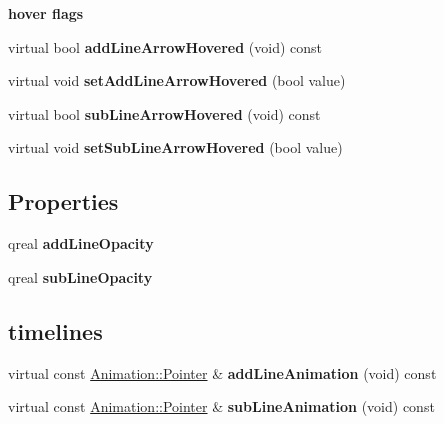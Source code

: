 \begin{Indent}\textbf{ hover flags}\par
\begin{DoxyCompactItemize}
\item 
\mbox{\label{class_scroll_bar_data_abe96d74a345394b7421f6507ba805c08}} 
virtual bool {\bfseries add\+Line\+Arrow\+Hovered} (void) const
\item 
\mbox{\label{class_scroll_bar_data_a78affef806031a1aae01b8c0bde2150b}} 
virtual void {\bfseries set\+Add\+Line\+Arrow\+Hovered} (bool value)
\item 
\mbox{\label{class_scroll_bar_data_a5256eb0fabcb461fc83ccb48c7d067ae}} 
virtual bool {\bfseries sub\+Line\+Arrow\+Hovered} (void) const
\item 
\mbox{\label{class_scroll_bar_data_a0571735c601564991db4e213904e5bf4}} 
virtual void {\bfseries set\+Sub\+Line\+Arrow\+Hovered} (bool value)
\end{DoxyCompactItemize}
\end{Indent}
\subsection*{Properties}
\begin{DoxyCompactItemize}
\item 
\mbox{\label{class_scroll_bar_data_adee96bdea0c97596be12cd7115dcb022}} 
qreal {\bfseries add\+Line\+Opacity}
\item 
\mbox{\label{class_scroll_bar_data_a53188c084e1a36886140305379eb3f6d}} 
qreal {\bfseries sub\+Line\+Opacity}
\end{DoxyCompactItemize}
\subsection*{timelines}
\begin{DoxyCompactItemize}
\item 
\mbox{\label{class_scroll_bar_data_af28d41071ddf6b99c59dad261faa1c05}} 
virtual const \hyperlink{class_animation_ac48a8d074abd43dc3f6485353ba24e30}{Animation\+::\+Pointer} \& {\bfseries add\+Line\+Animation} (void) const
\item 
\mbox{\label{class_scroll_bar_data_aff72f8d821c83e1a5ced1e6a37bca3b6}} 
virtual const \hyperlink{class_animation_ac48a8d074abd43dc3f6485353ba24e30}{Animation\+::\+Pointer} \& {\bfseries sub\+Line\+Animation} (void) const
\end{DoxyCompactItemize}
